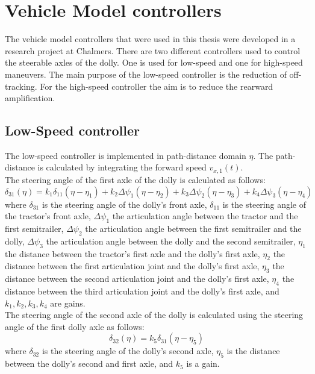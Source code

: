 \documentclass[ExampleMasters.tex]{subfiles}
\begin{document}
\clearpage
{\pagestyle{empty}\cleardoublepage}%
\chapter{Vehicle Model controllers}
\label{chap:steering_model}
The vehicle model controllers that were used in this thesis were developed in a research project at Chalmers.
There are two different controllers used to control the steerable axles of the dolly. One is used for low-speed and one for high-speed maneuvers. The main purpose of the low-speed controller is the reduction of off-tracking.
For the high-speed controller the aim is to reduce the rearward amplification.
\section{Low-Speed controller \cite{Low-speed_paper}}
\label{sec:low-speed_controller}
The low-speed controller is implemented in path-distance domain $\eta$. The path-distance is calculated by integrating the forward speed $v_{x,1}(t)$. \\
The steering angle of the first axle of the dolly is calculated as follows: 
\begin{equation}
\delta_{31}(\eta)=k_1\delta_{11}(\eta-\eta_1)+k_2\Delta\psi_1(\eta-\eta_2)+k_3\Delta\psi_2(\eta-\eta_3)+k_4\Delta\psi_3(\eta-\eta_4)
\end{equation}
\label{eq:delta31_lowspeed}
where $\delta_{31}$ is the steering angle of the dolly's front axle, $\delta_{11}$ is the steering angle of the tractor's front axle, $\Delta\psi_1$ the articulation angle between the tractor and the first semitrailer, $\Delta\psi_2$ the articulation angle between the first semitrailer and the dolly, $\Delta\psi_3$ the articulation angle between the dolly and the second semitrailer, $\eta_1$ the distance between the tractor's first axle and the dolly's first axle, $\eta_2$ the distance between the first articulation joint and the dolly's first axle, $\eta_3$ the distance between the second articulation joint and the dolly's first axle, $\eta_4$ the distance between the third articulation joint and the dolly's first axle, and $k_1, k_2, k_3, k_4$ are gains. 
\\The steering angle of the second axle of the dolly is calculated using the steering angle of the first dolly axle as follows:
\begin{equation}
\delta_{32}(\eta)=k_5\delta_{31}(\eta-\eta_5)
\end{equation}
\label{eq:delta32_lowspeed}
where $\delta_{32}$ is the steering angle of the dolly's second axle, $\eta_5$ is the distance between the dolly's second and first axle, and $k_5$ is a gain.\\
\end{document}
